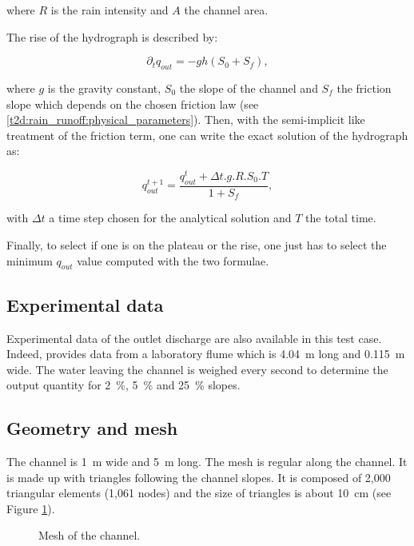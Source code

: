 where $R$ is the rain intensity and $A$ the channel area. 

The rise of the hydrograph is described by:

\begin{equation}
 \partial_tq_{out}=-gh(S_0+S_f),
\end{equation}

where $g$ is the gravity constant, $S_0$ the slope of the channel and
$S_f$ the friction slope which depends on the chosen friction law
(see \ref{t2d:rain_runoff:physical_parameters}).
Then, with the semi-implicit like treatment of the friction term, one can write
the exact solution of the hydrograph as:

\begin{equation}
 q_{out}^{t+1}=\dfrac{q_{out}^{t}+\Delta t.g.R.S_0.T}{1+S_f},
\end{equation}

with $\Delta t$ a time step chosen for the analytical solution and $T$ the total time. 

Finally, to select if one is on the plateau or the rise, one just has to select
the minimum $q_{out}$ value computed with the two formulae.

\subsection{Experimental data}

Experimental data of the outlet discharge are also available in this test case.
Indeed, \cite{Kirstetter2015} provides data from a laboratory flume which is
4.04~m long and 0.115~m wide.
The water leaving the channel is weighed every second to determine the output
quantity for 2~\%, 5~\% and 25~\% slopes.

\subsection{Geometry and mesh}

The channel is 1~m wide and 5~m long.
The mesh is regular along the channel. It is made up with
triangles following the channel slopes.
It is composed of 2,000 triangular elements (1,061 nodes)
and the size of triangles is about 10~cm
(see Figure \ref{t2d:rain_runoff:fig:mesh}).

\begin{figure}[!htbp]
 \centering
 \caption{Mesh of the channel.}
 \label{t2d:rain_runoff:fig:mesh}
\end{figure}

